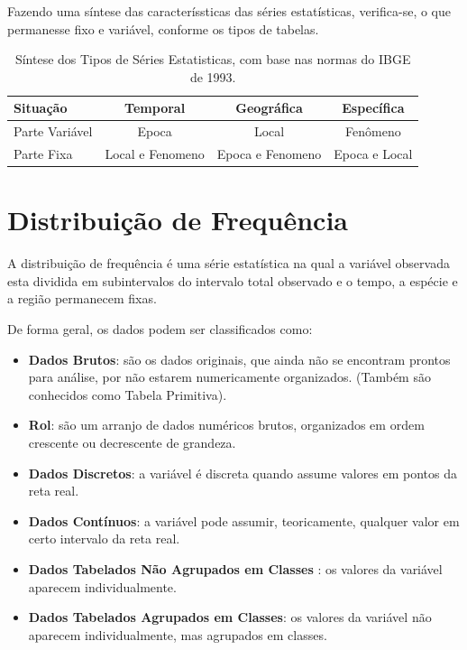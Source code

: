 Fazendo uma síntese das caracteríssticas das séries estatísticas, verifica-se, o que permanesse fixo e variável, conforme os tipos de tabelas.


\begin{table}[!htb]
    \centering
    {
    \caption{Síntese dos Tipos de Séries Estatisticas, com base nas normas
do IBGE de 1993.}
    \label{sintese serie}
    \vspace{0.1cm}
\begin{tabular}{l||c||c||c}
  \hline\hline
  Situação       & Temporal          & Geográfica       & Específica     \\
  \hline\hline
  Parte Variável &  Epoca            & Local            & Fenômeno      \\
  Parte Fixa     &  Local e Fenomeno & Epoca e Fenomeno & Epoca e Local \\
  \hline\hline
\end{tabular}}
\end{table}




\newpage
\section{Distribuição de Frequência}

A distribuição de frequência é uma série estatística na qual a variável observada esta dividida em subintervalos do intervalo total observado e o tempo, a espécie e a região permanecem fixas.\vskip0.3cm

De forma geral, os dados podem ser classificados como:


\begin{itemize}
  \item \textbf{Dados Brutos}: são os dados originais, que ainda não se encontram prontos para análise, por não estarem numericamente organizados. (Também são conhecidos como Tabela Primitiva).
  \item \textbf{Rol}: são um arranjo de dados numéricos brutos, organizados em ordem crescente ou decrescente de grandeza.
  \item \textbf{Dados Discretos}: a variável é discreta quando assume valores em pontos da reta real.
  \item \textbf{Dados Contínuos}: a variável pode assumir, teoricamente, qualquer valor em certo intervalo da reta real.
  \item \textbf{Dados Tabelados Não Agrupados em Classes} : os valores da variável aparecem individualmente.
  \item \textbf{Dados Tabelados Agrupados em Classes}: os valores da variável não aparecem individualmente, mas agrupados em classes.
\end{itemize}


